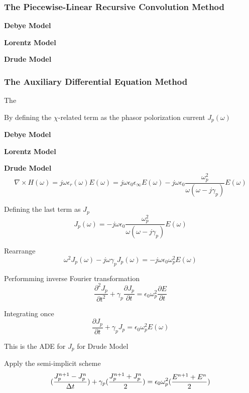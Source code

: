 \subsubsection{The Piecewise-Linear Recursive Convolution Method}
\textbf{Debye Model}

\textbf{Lorentz Model}

\textbf{Drude Model}

\subsubsection{The Auxiliary Differential Equation Method}
The 

By defining the $\chi$-related term as the phasor polorization current $J_p(\omega)$

\textbf{Debye Model}

\textbf{Lorentz Model}

\textbf{Drude Model}
\begin{displaymath}
    \nabla \times H(\omega) = j\omega \epsilon_r(\omega)E(\omega) = j\omega\epsilon_0 \epsilon_{\infty} E(\omega) - j\omega\epsilon_0\frac{\omega_p^2}{\omega(\omega-j\gamma_p)}E(\omega)
\end{displaymath}

Defining the last term as $J_p$
\begin{displaymath}
  J_p(\omega) = -j\omega\epsilon_0\frac{\omega_p^2}{\omega(\omega-j\gamma_p)}E(\omega)
\end{displaymath}

Rearrange
\begin{displaymath}
  \omega^2J_p(\omega) - j\omega\gamma_pJ_p(\omega) = -j\omega\epsilon_0\omega_p^2 E(\omega)
\end{displaymath}

Performming inverse Fourier transformation
\begin{displaymath}
  \frac{\partial^2 J_p}{\partial t^2} + \gamma_p \frac{\partial J_p}{\partial t} = \epsilon_0\omega_p^2\frac{\partial E}{\partial t}
\end{displaymath}

Integrating once
\begin{displaymath}
  \frac{\partial J_p}{\partial t} + \gamma_p J_p = \epsilon_0 \omega_p^2 E(\omega)
\end{displaymath}

This is the ADE for $J_p$ for Drude Model

Apply the semi-implicit scheme
\begin{displaymath}
  \Huge(\frac{J_p^{n+1} - J_p^n}{\Delta t}\Huge) + \gamma_{p}\Huge(\frac{J_p^{n+1} + J_p^n}{2}\Huge) = \epsilon_0\omega_p^2\Huge(\frac{E^{n+1} + E^n}{2}\Huge)
\end{displaymath}

